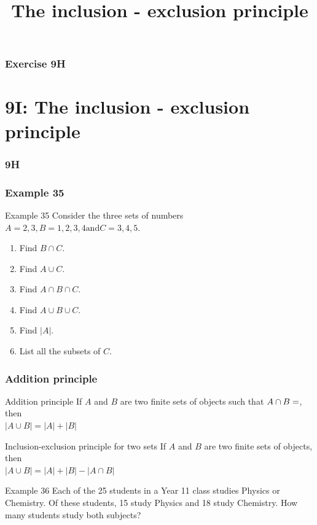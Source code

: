 \documentclass[
	11pt, %
]{beamer}
\begin{document}
\begin{frame}
    \frametitle{Exercise 9H}
\end{frame}


\section{9I: The inclusion - exclusion principle}
\begin{frame}
    \frametitle{9H}
    \begin{center}
        \title{The inclusion - exclusion principle}
        \maketitle
    \end{center}
\end{frame}

\begin{frame}[t]
    \frametitle{Example 35}
    \begin{block}{Example 35}
        Consider the three sets of numbers $A = {2,3}, B = {1,2,3,4} \text{and} C = {3,4,5}$.      
        \begin{enumerate}
            \item Find $B \cap C.$
            \item Find $A \cup C.$
            \item Find $A \cap B \cap C$.
            \item Find $A \cup B \cup C$.
            \item Find $|A|$.
            \item List all the subsets of $C$.
        \end{enumerate}  
    \end{block}
\end{frame}

\begin{frame}
    \frametitle{Addition principle}
    \begin{block}{Addition principle}
        If $A$ and $B$ are two finite sets of objects such that $A \cap B = \empty$, then\\
        $|A \cup B| = |A| + |B|$        
    \end{block}
    \begin{block}{Inclusion-exclusion principle for two sets}
        If $A$ and $B$ are two finite sets of objects, then\\
        $|A\cup B| = |A| + |B| - |A\cap B|$
    \end{block}
    \begin{block}{Example 36}
        Each of the 25 students in a Year 11 class studies Physics or Chemistry. Of these students, 
        15 study Physics and 18 study Chemistry. How many students study both subjects?  
    \end{block}
\end{frame}
\end{document}
